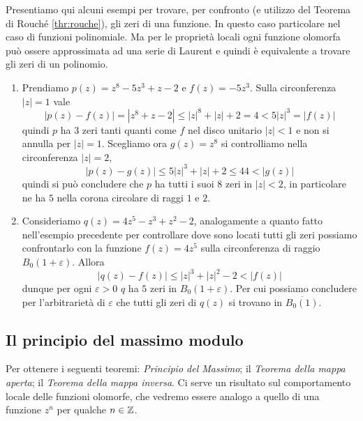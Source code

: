 \begin{example}
  Presentiamo qui alcuni esempi per trovare, per confronto (e utilizzo del
  Teorema di Rouché \ref{thr:rouche}), gli zeri di una funzione. In questo caso
  particolare nel caso di funzioni polinomiale. Ma per le proprietà locali ogni
  funzione olomorfa può ossere approssimata ad una serie di Laurent e quindi
  è equivalente a trovare gli zeri di un polinomio.
  \begin{enumerate}
    \item Prendiamo $p(z) = z^8 - 5z^3 + z -2$ e $f(z) = -5z^3$. Sulla
      circonferenza $|z| = 1$ vale 
      \begin{equation*}
        |p(z) - f(z)| = |z^8 + z -2| \le |z|^8 + |z| + 2 = 4 < 5|z|^3 = |f(z)|
      \end{equation*}
      quindi $p$ ha $3$ zeri tanti quanti come $f$ nel disco unitario $|z| < 1$
      e non si annulla per $|z| =1$. Scegliamo ora $g(z) = z^8$ si controlliamo
      nella circonferenza $|z| = 2$, 
      \begin{equation*}
        |p(z) - g(z)| \le 5|z|^3 + |z| + 2 \le 44 < |g(z)|
      \end{equation*}
      quindi si può concludere che $p$ ha tutti i suoi $8$ zeri in $|z| < 2$, in
      particolare ne ha $5$ nella corona circolare di raggi $1$ e $2$.
    \item Consideriamo $q(z) = 4z^5 - z^3 + z^2 -2$, analogamente a quanto fatto
      nell'esempio precedente per controllare dove sono locati tutti gli zeri
      possiamo confrontarlo con la funzione $f(z) = 4z^5$ sulla circonferenza di
      raggio $B_0(1+\varepsilon)$. Allora
      \begin{equation*}
        |q(z) - f(z)| \le |z|^3 + |z|^2 - 2 < |f(z)|
      \end{equation*}
      dunque per ogni $\varepsilon > 0$ $q$ ha $5$ zeri in $B_0(1+\varepsilon)$.
      Per cui possiamo concludere per l'arbitrarietà di $\varepsilon$ che tutti
      gli zeri di $q(z)$ si trovano in $\overline{B_0(1)}$.
  \end{enumerate}
\end{example}

\subsection{\textcolor{AnComp}{\textbf{Il principio del massimo modulo}}}

Per ottenere i seguenti teoremi: \emph{Principio del Massimo}; il 
\emph{Teorema della mappa aperta}; il \emph{Teorema della mappa inversa}. Ci
serve un risultato sul comportamento locale delle funzioni olomorfe, che vedremo
essere analogo a quello di una funzione $z^n$ per qualche $n\in \mathbb{Z}$.

